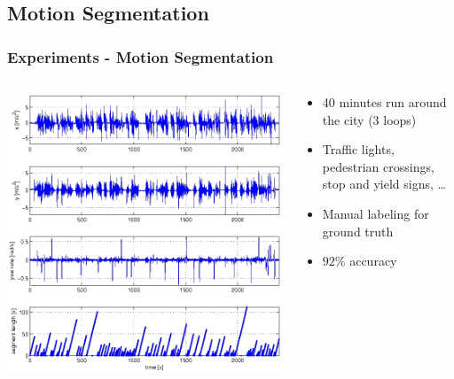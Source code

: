 \documentclass{beamer}
\begin{document}
\subsection{Motion Segmentation}
\begin{frame}[t]
  \frametitle{Experiments - Motion Segmentation}
  \begin{columns}[c]
    \begin{column}{5cm}
      \includegraphics[scale=0.3]{figures/cpResult}
    \end{column}
    \begin{column}{5cm}
      \begin{itemize}
        \item 40 minutes run around the city (3 loops)
        \item Traffic lights, pedestrian crossings, stop and yield signs, \dots
        \item Manual labeling for ground truth
        \item $92\%$ accuracy
      \end{itemize}
    \end{column}
  \end{columns}
\end{frame}
\end{document}
